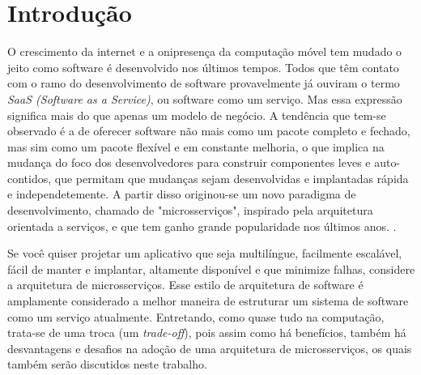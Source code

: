 \chapter{Introdução}\label{chapter-introducao}

O crescimento da internet e a onipresença da computação móvel tem mudado o jeito como software é desenvolvido nos últimos tempos. Todos que têm contato com o ramo do desenvolvimento de software provavelmente já ouviram o termo \emph{SaaS (Software as a Service)}, ou software como um serviço. Mas essa expressão significa mais do que apenas um modelo de negócio. A tendência que tem-se observado é a de oferecer software não mais como um pacote completo e fechado, mas sim como um pacote flexível e em constante melhoria, o que implica na mudança do foco dos desenvolvedores para construir componentes leves e auto-contidos, que permitam que mudanças sejam desenvolvidas e implantadas rápida e independetemente. A partir disso originou-se um novo paradigma de desenvolvimento, chamado de "microsserviços", inspirado pela arquitetura orientada a serviços, e que tem ganho grande popularidade nos últimos anos. \cite{middleware-microservices,design-monitoring-testing-waseem}.

Se você quiser projetar um aplicativo que seja multilíngue, facilmente escalável, fácil de manter e implantar, altamente disponível e que minimize falhas, considere a arquitetura de microsserviços. Esse estilo de arquitetura de software é amplamente considerado a melhor maneira de estruturar um sistema de software como um serviço atualmente. Entretando, como quase tudo na computação, trata-se de uma troca (um \emph{trade-off}), pois assim como há benefícios, também há desvantagens e desafios na adoção de uma arquitetura de microsserviços, os quais também serão discutidos neste trabalho. \cite{CAOPLE, oracle_microservices}




